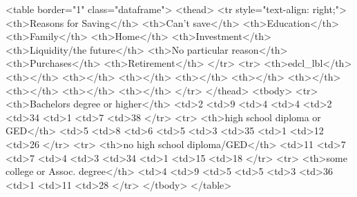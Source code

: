 <table border="1" class="dataframe">
  <thead>
    <tr style="text-align: right;">
      <th>Reasons for Saving</th>
      <th>Can't save</th>
      <th>Education</th>
      <th>Family</th>
      <th>Home</th>
      <th>Investment</th>
      <th>Liquidity/the future</th>
      <th>No particular reason</th>
      <th>Purchases</th>
      <th>Retirement</th>
    </tr>
    <tr>
      <th>edcl_lbl</th>
      <th></th>
      <th></th>
      <th></th>
      <th></th>
      <th></th>
      <th></th>
      <th></th>
      <th></th>
      <th></th>
    </tr>
  </thead>
  <tbody>
    <tr>
      <th>Bachelors degree or higher</th>
      <td>2%
      <td>9%
      <td>4%
      <td>4%
      <td>2%
      <td>34%
      <td>1%
      <td>7%
      <td>38%
    </tr>
    <tr>
      <th>high school diploma or GED</th>
      <td>5%
      <td>8%
      <td>6%
      <td>5%
      <td>3%
      <td>35%
      <td>1%
      <td>12%
      <td>26%
    </tr>
    <tr>
      <th>no high school diploma/GED</th>
      <td>11%
      <td>7%
      <td>7%
      <td>4%
      <td>3%
      <td>34%
      <td>1%
      <td>15%
      <td>18%
    </tr>
    <tr>
      <th>some college or Assoc. degree</th>
      <td>4%
      <td>9%
      <td>5%
      <td>5%
      <td>3%
      <td>36%
      <td>1%
      <td>11%
      <td>28%
    </tr>
  </tbody>
</table>